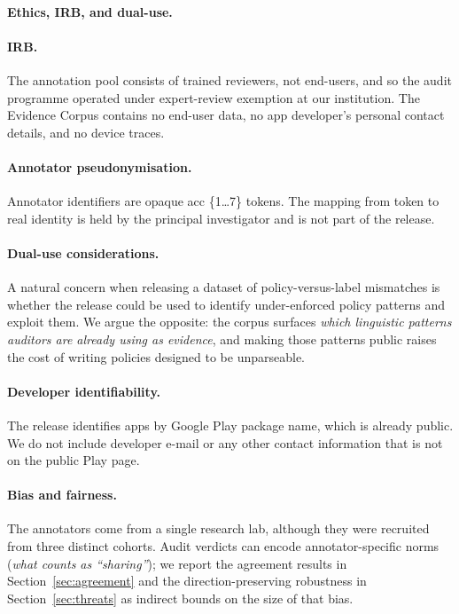 \documentclass[11pt,a4paper]{article}
\newcommand{\dec}[1]{\textsf{#1}}
\begin{document}
\paragraph{Ethics, IRB, and dual-use.}\label{sec:ethics}
\paragraph{IRB.} The annotation pool consists of trained reviewers, not
end-users, and so the audit programme operated under expert-review
exemption at our institution. The Evidence Corpus contains no
end-user data, no app developer's personal contact details, and no
device traces.

\paragraph{Annotator pseudonymisation.} Annotator identifiers are
opaque \dec{acc \{1\dots7\}} tokens. The mapping from token to
real identity is held by the principal investigator and is not part of
the release.

\paragraph{Dual-use considerations.} A natural concern when releasing
a dataset of policy-versus-label mismatches is whether the release
could be used to identify under-enforced policy patterns and exploit
them. We argue the opposite: the corpus surfaces \emph{which
linguistic patterns auditors are already using as evidence}, and
making those patterns public raises the cost of writing policies
designed to be unparseable.

\paragraph{Developer identifiability.} The release identifies apps by
Google Play package name, which is already public. We do not include
developer e-mail or any other contact information that is not on the
public Play page.

\paragraph{Bias and fairness.}
The annotators come from a single research lab, although they were
recruited from three distinct cohorts. Audit verdicts can encode
annotator-specific norms (\emph{what counts as ``sharing''}); we
report the agreement results in Section~\ref{sec:agreement} and the
direction-preserving robustness in Section~\ref{sec:threats} as
indirect bounds on the size of that bias.
\end{document}
